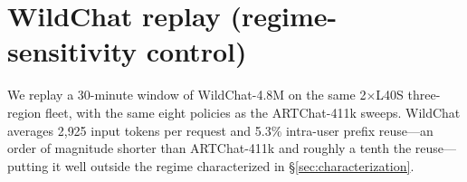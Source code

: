 \documentclass{article}
\begin{document}
\newpage





\appendix

\section{WildChat replay (regime-sensitivity control)}
\label{app:wildchat}

We replay a 30-minute window of WildChat-4.8M \citep{wildchat2024} on the
same 2$\times$L40S three-region fleet, with the same eight policies as the
ARTChat-411k sweeps. WildChat averages 2{,}925 input tokens per request and
5.3\% intra-user prefix reuse---an order of magnitude shorter than ARTChat-411k
and roughly a tenth the reuse---putting it well outside the regime
characterized in \S\ref{sec:characterization}.
\end{document}
